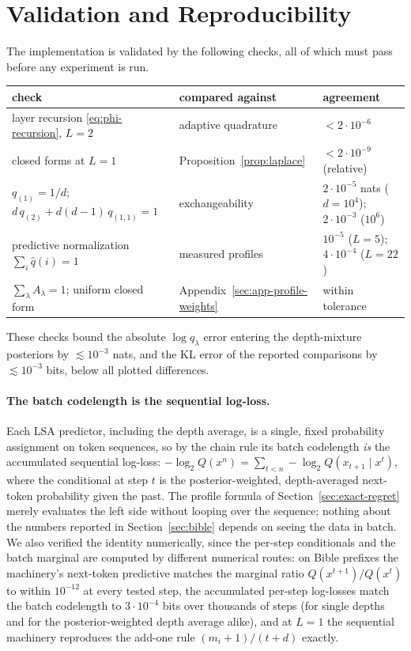 \documentclass[11pt]{article}
\begin{document}
\section{Validation and Reproducibility}
\label{sec:app-validation}
The implementation is validated by the following checks, all of which must
pass before any experiment is run.
\begin{center}
\small
\begin{tabular}{lll}
  \toprule
  check & compared against & agreement \\
  \midrule
  layer recursion \eqref{eq:phi-recursion}, \(L=2\) & adaptive quadrature & \(<2\cdot10^{-6}\) \\
  closed forms at \(L=1\) & Proposition~\ref{prop:laplace} & \(<2\cdot10^{-9}\) (relative) \\
  \(q_{(1)}=1/d\); \(d\,q_{(2)}+d(d-1)\,q_{(1,1)}=1\) & exchangeability & \(2\cdot10^{-5}\) nats (\(d=10^4\)); \(2\cdot10^{-3}\) (\(10^6\)) \\
  predictive normalization \(\sum_i\hat q(i)=1\) & measured profiles & \(10^{-5}\) (\(L=5\)); \(4\cdot10^{-4}\) (\(L=22\)) \\
  \(\sum_\lambda A_\lambda=1\); uniform closed form & Appendix~\ref{sec:app-profile-weights} & within tolerance \\
  \bottomrule
\end{tabular}
\end{center}
These checks bound the absolute \(\log q_\lambda\) error entering the
depth-mixture posteriors by \(\lesssim10^{-3}\) nats, and the KL error of
the reported comparisons by \(\lesssim10^{-3}\) bits, below all plotted
differences.

\paragraph{The batch codelength is the sequential log-loss.}
Each LSA predictor, including the depth average, is a single, fixed
probability assignment on token sequences, so by the chain rule its batch
codelength \emph{is} the accumulated sequential log-loss:
\(-\log_2 Q(x^n)=\sum_{t<n}-\log_2 Q(x_{t+1}\mid x^t)\), where the
conditional at step \(t\) is the posterior-weighted, depth-averaged
next-token probability given the past.  The profile formula of
Section~\ref{sec:exact-regret} merely evaluates the left side without
looping over the sequence; nothing about the numbers reported in
Section~\ref{sec:bible} depends on seeing the data in batch.  We also
verified the identity numerically, since the per-step conditionals and the
batch marginal are computed by different numerical routes: on Bible
prefixes the machinery's next-token predictive matches the marginal ratio
\(Q(x^{t+1})/Q(x^{t})\) to within \(10^{-12}\) at every tested step, the
accumulated per-step log-losses match the batch codelength to
\(3\cdot10^{-4}\) bits over thousands of steps (for single depths and for
the posterior-weighted depth average alike), and at \(L=1\) the sequential
machinery reproduces the add-one rule \((m_i+1)/(t+d)\) exactly.
\end{document}
